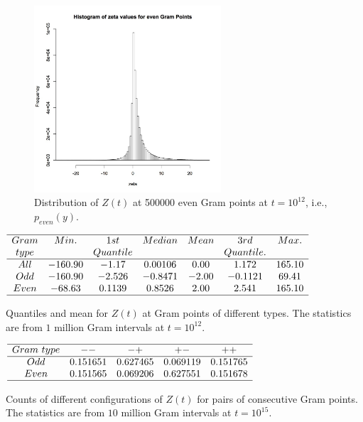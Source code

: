 \documentclass[twoside]{article}
\theoremstyle{definition}
\begin{document}
{\begin{figure}
\includegraphics[width=0.62\textwidth]{ezeta.jpg}
\caption[]{ 
   Distribution of $Z(t)$ at 500000 even Gram points  at $t = 10^{12}$, i.e., $p_{even}(y)$.
 }
\label{evenhist}
\vspace{1mm}
\end{figure}

\begin{table}
\centering \(\begin{array}{ccccccc}
\hline
 Gram &     Min.   & 1st    &  Median    &   Mean   & 3rd    &   Max. \\
 type &              & Quantile   &            &              & Quantile.    &   \\
\hline
All& -160.90 &   -1.17 &    0.00106 &   0.00  &  1.172 &165.10\\
Odd&-160.90 &   -2.526 &   -0.8471  & -2.00 &   -0.1121 &  69.41 \\
Even&-68.63 &   0.1139 &  0.8526  & 2.00 &   2.541 & 165.10 \\
\hline
\end{array}\)
\caption{Quantiles and mean for  $Z(t)$ at Gram points of different types.  The statistics are from $1$ million Gram intervals at $t=10^{12}$.} \label{tab:quantiles}
\end{table}


\begin{table}
\centering \(\begin{array}{ccccc}
\hline
 Gram~type&   --   & -+   & +-   & ++  \\
\hline
Odd & 0.151651&0.627465&0.069119&0.151765 \\
Even & 0.151565&0.069206&0.627551&0.151678 \\
\hline
\end{array}\)
\caption{Counts of different configurations of $Z(t)$  for pairs of consecutive Gram points.  The statistics are from $10$ million Gram intervals at $t=10^{15}$.} \label{tab:pairraw}
\end{table}

}
\end{document}

